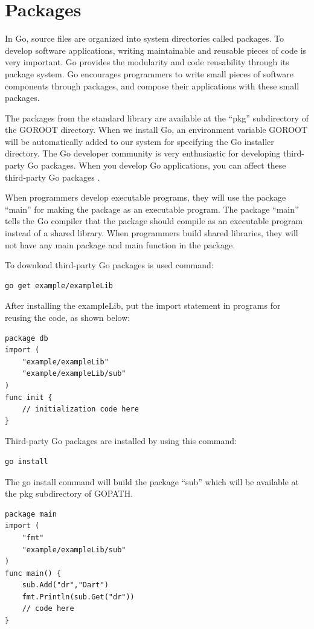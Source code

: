 \documentclass[
  digital, %
  notable,   %
  lof,     %
  lot,     %
]{fithesis3}
\begin{document}
\section{Packages}
In Go, source files are organized into system directories called packages. To  develop 
software applications, writing maintainable and reusable pieces of code is very important. Go 
provides the modularity and code reusability through its package system. Go encourages 
programmers to write small pieces of software components through packages, and compose their  
applications with these small packages.

The packages from the standard library are available at the “pkg” subdirectory of the GOROOT 
directory. When we install Go, an environment variable GOROOT will be automatically added to 
our system for specifying the Go installer directory. The Go developer community is very 
enthusiastic for developing third-party Go packages. When you develop Go applications, you can 
affect these third-party Go packages \cite{stack_2014}.

When programmers develop executable programs, they will use the package “main” for making the 
package as an executable program. The package “main” tells the Go compiler that the package 
should compile as an executable program instead of a shared library. When programmers build 
shared libraries, they will not have any main package and main function in the package.

To download third-party Go packages is used command: 
\begin{lstlisting}
go get example/exampleLib
\end{lstlisting}
After installing the exampleLib, put the import statement in programs for reusing the code, as 
shown below:
\begin{lstlisting}
package db
import (
	"example/exampleLib"
	"example/exampleLib/sub"
)
func init {
	// initialization code here    
}
\end{lstlisting}
Third-party Go packages are installed by using this command: 
\begin{lstlisting}
go install
\end{lstlisting}
The go install command will build the package “sub” which will be available at the pkg 
subdirectory of GOPATH.
\begin{lstlisting}
package main
import (
	"fmt"
	"example/exampleLib/sub"
)
func main() {
    sub.Add("dr","Dart")
    fmt.Println(sub.Get("dr"))
    // code here    
}
\end{lstlisting}
\end{document}
